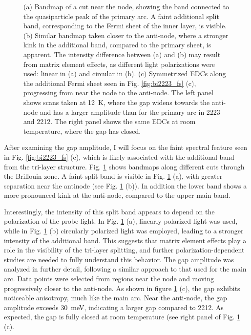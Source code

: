 \begin{figure}
	\caption{(a) Bandmap of a cut near the node, showing the band connected to the quasiparticle peak of the primary arc. A faint additional split band, corresponding to the Fermi sheet of the inner  layer, is visible. (b) Similar bandmap taken closer to the anti-node, where a stronger kink in the additional band, compared to the primary sheet, is apparent. The intensity difference between (a) and (b) may result from matrix element effects, as different light polarizations were used: linear in (a) and circular in (b). (c) Symmetrized EDCs along the additional Fermi sheet seen in Fig. \ref{fig:bi2223_fs} (c), progressing from near the node to the anti-node. The left panel shows scans taken at \qty{12}{\kelvin}, where the gap widens towards the anti-node and has a larger amplitude than for the primary arc in 2223 and 2212. The right panel shows the same EDCs at room temperature, where the gap has closed.}
	\label{fig:trilayer_splitting}
\end{figure}

After examining the gap amplitude, I will focus on the faint spectral feature seen in Fig. \ref{fig:bi2223_fs} (c), which is likely associated with the additional band from the tri-layer structure.
Fig. \ref{fig:trilayer_splitting} shows bandmaps along different cuts through the Brillouin zone.
A faint split band is visible in Fig. \ref{fig:trilayer_splitting} (a), with greater separation near the antinode (see Fig. \ref{fig:trilayer_splitting} (b)).
In addition the lower band shows a more pronounced kink at the anti-node, compared to the upper main band.

Interestingly, the intensity of this split band appears to depend on the polarization of the probe light.
In Fig. \ref{fig:trilayer_splitting} (a), linearly polarized light was used, while in Fig. \ref{fig:trilayer_splitting} (b) circularly polarized light was employed, leading to a stronger intensity of the additional band.
This suggests that matrix element effects play a role in the visibility of the tri-layer splitting, and further polarization-dependent studies are needed to fully understand this behavior.
The gap amplitude was analyzed in further detail, following a similar approach to that used for the main arc.
Data points were selected from regions near the node and moving progressively closer to the anti-node.
As shown in figure \ref{fig:trilayer_splitting} (c), the gap exhibits noticeable anisotropy, much like the main arc.
Near the anti-node, the gap amplitude exceeds \qty{30}{\milli\electronvolt}, indicating a larger gap compared to 2212.
As expected, the gap is fully closed at room temperature (see right panel of Fig. \ref{fig:trilayer_splitting} (c).

